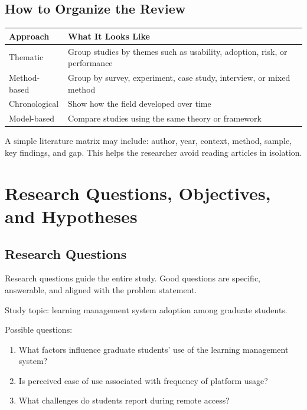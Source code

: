 \documentclass[11pt,a4paper]{article}
\begin{document}
\subsection{How to Organize the Review}

\begin{longtable}{L{3.1cm}L{8.3cm}}
\toprule
\textbf{Approach} & \textbf{What It Looks Like} \\
\midrule
Thematic & Group studies by themes such as usability, adoption, risk, or performance \\
Method-based & Group by survey, experiment, case study, interview, or mixed method \\
Chronological & Show how the field developed over time \\
Model-based & Compare studies using the same theory or framework \\
\bottomrule
\end{longtable}

\begin{examplebox}
A simple literature matrix may include: author, year, context, method, sample, key findings, and gap. This helps the researcher avoid reading articles in isolation.
\end{examplebox}

\section{Research Questions, Objectives, and Hypotheses}

\subsection{Research Questions}

Research questions guide the entire study. Good questions are specific, answerable, and aligned with the problem statement.

\begin{examplebox}
Study topic: learning management system adoption among graduate students.

Possible questions:
\begin{enumerate}[leftmargin=*]
  \item What factors influence graduate students' use of the learning management system?
  \item Is perceived ease of use associated with frequency of platform usage?
  \item What challenges do students report during remote access? 
\end{enumerate}
\end{examplebox}
\end{document}
